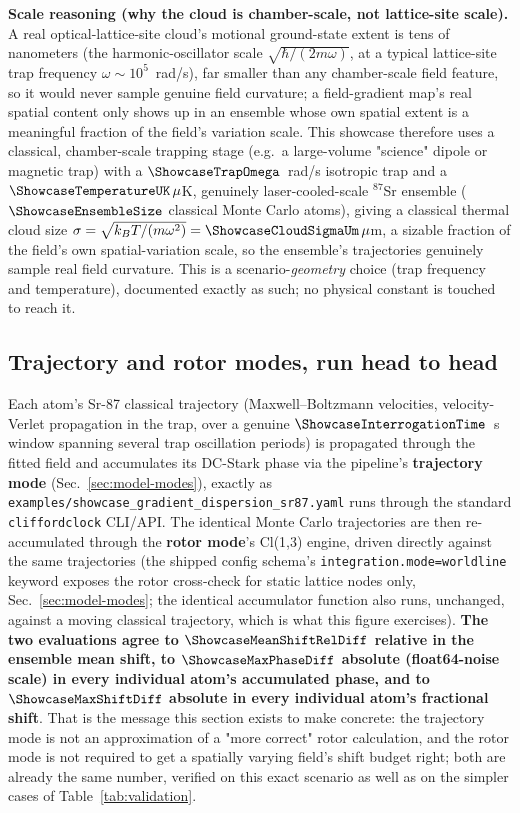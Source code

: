\documentclass[aps,pra,superscriptaddress,groupedaddress,nofootinbib]{revtex4-2}
\begin{document}
\textbf{Scale reasoning (why the cloud is chamber-scale, not
lattice-site scale).} A real optical-lattice-site cloud's motional
ground-state extent is tens of nanometers (the harmonic-oscillator
scale $\sqrt{\hbar/(2m\omega)}$, at a typical lattice-site trap
frequency $\omega\sim10^5$~rad/s), far smaller than any chamber-scale
field feature, so it would never sample genuine field curvature; a
field-gradient map's real spatial content only shows up in
an ensemble whose own spatial extent is a meaningful fraction of the
field's variation scale. This showcase therefore uses a classical,
chamber-scale trapping stage (e.g.\ a large-volume "science" dipole or
magnetic trap) with a $\ShowcaseTrapOmega$~rad/s
isotropic trap and a $\ShowcaseTemperatureUK\,\mu$K, genuinely
laser-cooled-scale $^{87}$Sr ensemble ($\ShowcaseEnsembleSize$ classical
Monte Carlo atoms), giving a classical thermal cloud size
$\sigma=\sqrt{k_BT/(m\omega^2)}=\ShowcaseCloudSigmaUm\,\mu$m, a sizable
fraction of the field's own spatial-variation scale, so the ensemble's
trajectories genuinely sample real field curvature. This is a scenario-\emph{geometry} choice
(trap frequency and temperature), documented exactly as such; no physical
constant is touched to reach it.

\subsection{Trajectory and rotor modes, run head to head}

Each atom's Sr-87 classical trajectory (Maxwell--Boltzmann velocities,
velocity-Verlet propagation in the trap, over a genuine
$\ShowcaseInterrogationTime$~s window spanning several trap oscillation
periods) is propagated through the fitted field and accumulates its
DC-Stark phase via the pipeline's \textbf{trajectory mode}
(Sec.~\ref{sec:model-modes}), exactly as
\texttt{examples/showcase\_gradient\_\allowbreak dispersion\_sr87.yaml}
runs through the standard \texttt{cliffordclock} CLI/API. The identical Monte Carlo
trajectories are then re-accumulated through the \textbf{rotor mode}'s
Cl(1,3) engine, driven directly against the same trajectories (the
shipped config schema's \texttt{integration.mode=worldline} keyword
exposes the rotor cross-check for static lattice nodes only,
Sec.~\ref{sec:model-modes}; the identical accumulator function
also runs, unchanged, against a moving classical trajectory, which is
what this figure exercises). \textbf{The two evaluations agree to
$\ShowcaseMeanShiftRelDiff$ relative in the ensemble mean shift, to
$\ShowcaseMaxPhaseDiff$ absolute (float64-noise scale) in every
individual atom's accumulated phase, and to $\ShowcaseMaxShiftDiff$
absolute in every individual atom's fractional shift}. That is the
message this section exists to make concrete: the trajectory mode is not an
approximation of a "more correct" rotor calculation, and the rotor mode
is not required to
get a spatially varying field's shift budget right; both are already
the same number, verified on this exact scenario as well as on the
simpler cases of Table~\ref{tab:validation}.
\end{document}
